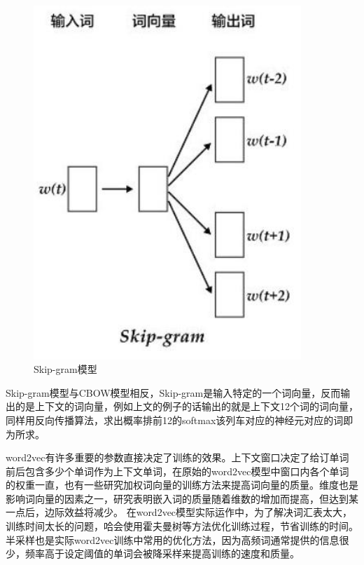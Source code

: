 \documentclass[winfonts,master,oneside,nobackinfo]{njuthesis}
\begin{document}
\begin{figure}[h]
\centering
\begin{minipage}[t]{0.5\textwidth}
\includegraphics[width=0.9\textwidth]{./figure/Skip-gram模型.jpg}
\caption{Skip-gram模型}
\label{lab:1}
\end{minipage}
\end{figure}

Skip-gram模型与CBOW模型相反，Skip-gram是输入特定的一个词向量，反而输出的是上下文的词向量，例如上文的例子的话输出的就是上下文12个词的词向量，同样用反向传播算法，求出概率排前12的softmax该列车对应的神经元对应的词即为所求。

word2vec有许多重要的参数直接决定了训练的效果。上下文窗口决定了给订单词前后包含多少个单词作为上下文单词，在原始的word2vec模型中窗口内各个单词的权重一直，也有一些研究加权词向量的训练方法\cite{myh}来提高词向量的质量。维度也是影响词向量的因素之一，研究表明嵌入词的质量随着维数的增加而提高，但达到某一点后，边际效益将减少\cite{Mikolov}。
在word2vec模型实际运作中，为了解决词汇表太大，训练时间太长的问题，哈会使用霍夫曼树等方法优化训练过程，节省训练的时间。半采样也是实际word2vec训练中常用的优化方法，因为高频词通常提供的信息很少，频率高于设定阈值的单词会被降采样来提高训练的速度和质量。
\end{document}

